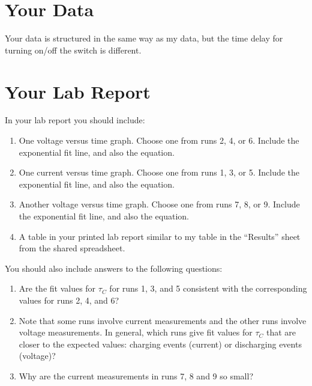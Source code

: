 \section{Your Data}
%
Your data is structured in the same way as my data, but the time delay for turning on/off the switch is different.
%
\section{Your Lab Report}
%
In your lab report you should include:
\begin{enumerate}
	\item One voltage versus time graph. Choose one from runs 2, 4, or 6. Include the exponential fit line, and also the equation.
	\item One current versus time graph. Choose one from runs 1, 3, or 5. Include the exponential fit line, and also the equation.
	\item Another voltage versus time graph. Choose one from runs 7, 8, or 9. Include the exponential fit line, and also the equation.
	\item A table in your printed lab report similar to my table in the ``Results'' sheet from the shared spreadsheet.
\end{enumerate}
You should also include answers to the following questions:
\begin{enumerate}
	\item Are the fit values for $\tau_{C}$ for runs 1, 3, and 5 consistent with the corresponding values for runs 2, 4, and 6?
	\item Note that some runs involve current measurements and the other runs involve voltage measurements. In general, which runs give fit values for $\tau_{C}$ that are closer to the expected values: charging events (current) or discharging events (voltage)?
	\item Why are the current measurements in runs 7, 8 and 9 so small?
\end{enumerate}